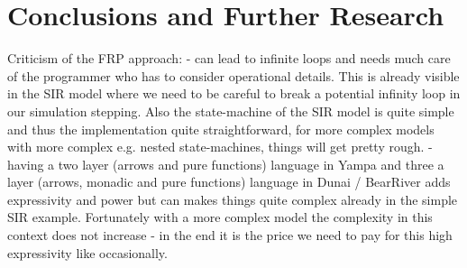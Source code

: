 \section{Conclusions and Further Research}
Criticism of the FRP approach:
- can lead to infinite loops and needs much care of the programmer who has to consider operational details. This is already visible in the SIR model where we need to be careful to break a potential infinity loop in our simulation stepping. Also the state-machine of the SIR model is quite simple and thus the implementation quite straightforward, for more complex models with more complex e.g. nested state-machines, things will get pretty rough.
- having a two layer (arrows and pure functions) language in Yampa \cite{jeffrey_causality_2013} and three a layer (arrows, monadic and pure functions) language in Dunai / BearRiver adds expressivity and power but can makes things quite complex already in the simple SIR example. Fortunately with a more complex model the complexity in this context does not increase - in the end it is the price we need to pay for this high expressivity like occasionally.

